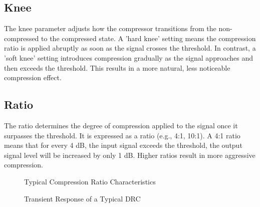 \documentclass[10pt]{article}
\begin{document}
\begin{multicols}{2}
            \subsection{Knee}
                The knee parameter adjusts how the compressor transitions from the non-compressed to the compressed state. A 'hard knee' setting means the compression ratio is applied abruptly as soon as the signal crosses the threshold. In contrast, a 'soft knee' setting introduces compression gradually as the signal approaches and then exceeds the threshold. This results in a more natural, less noticeable compression effect.

            \subsection{Ratio}
                The ratio determines the degree of compression applied to the signal once it surpasses the threshold. It is expressed as a ratio (e.g., 4:1, 10:1). A 4:1 ratio means that for every 4 dB, the input signal exceeds the threshold, the output signal level will be increased by only 1 dB. Higher ratios result in more aggressive compression.
        
            \begin{figure*}[!t]
                \centering
                \begin{minipage}{0.5\linewidth}
                    \centering
                    
                    \caption{Typical Compression Ratio Characteristics}
                    \label{fig:comp-ratio}
                \end{minipage}\hfill
                \begin{minipage}{0.5\linewidth}
                    \centering
                    
                    \caption{Transient Response of a Typical DRC}
                    \label{fig:comp-trans}
                \end{minipage}\hfill
            \end{figure*}


\end{multicols}
\end{document}
